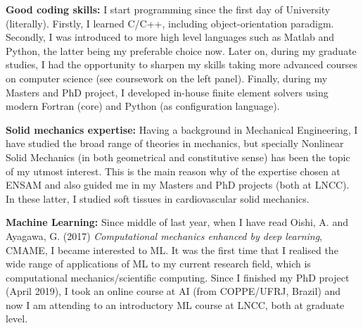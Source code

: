 \documentclass[letterpaper]{twentysecondcv} %
\begin{document}
\item \textbf{Good coding skills:} I start programming since the first day of University (literally). Firstly, I learned C/C++, including object-orientation paradigm. Secondly, I was introduced to more high level languages such as Matlab and Python, the latter being my preferable choice now. Later on, during my graduate studies, I had the opportunity to sharpen my skills taking more advanced courses on computer science (see coursework on the left panel). Finally, during my Masters and PhD project, I developed in-house finite element solvers using modern Fortran (core) and Python (as configuration language).  
\item \textbf{Solid mechanics expertise:} Having a background in Mechanical Engineering, I have studied the broad range of theories in mechanics, but specially Nonlinear Solid Mechanics (in both geometrical and constitutive sense) has been the topic of my utmost interest. This is the main reason why of the expertise chosen at ENSAM and also guided me in my Masters and PhD projects (both at LNCC). In these latter, I studied soft tissues in cardiovascular solid mechanics. 
\item \textbf{Machine Learning:} Since middle of last year, when I have read Oishi, A. and Ayagawa, G. (2017) \textit{Computational mechanics enhanced by deep learning}, CMAME, I became interested to ML. It was the first time that I realised the wide range of applications of ML to my current research field, which is computational mechanics/scientific computing. Since I finished my PhD project (April 2019), I took an online course at AI (from COPPE/UFRJ, Brazil) and now I am attending to an introductory ML course at LNCC, both at graduate level.  
\end{document}
